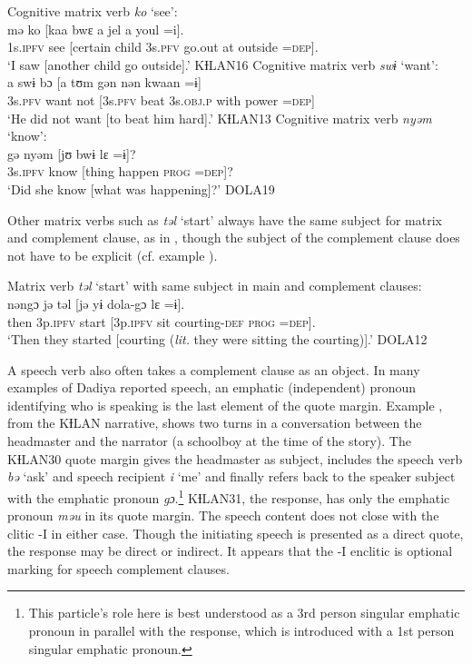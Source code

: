 \documentclass[output=paper]{langscibook}
\begin{document}
\ea Cognitive matrix verb \textit{ko} `see':
\label{ex:dettweiler:KƗLAN16} \\
\gll mə ko [kaa bwɛ a jel a youl =i]. \\
1s.\textsc{ipfv} see [certain child 3s.\textsc{pfv} go.out at outside =\textsc{dep}]. \\
\glt `I saw [another child go outside].' KƗLAN16
\ex Cognitive matrix verb \textit{swɨ} `want':
\label{ex:dettweiler:KƗLAN13} \\
\gll a swɨ bɔ [a tʊm gən nən kwaan =ɨ] \\
3s.\textsc{pfv} want not [3s.\textsc{pfv} beat 3s.\textsc{obj}.\textsc{p} with power =\textsc{dep}] \\
\glt `He did not want [to beat him hard].' KƗLAN13
\ex Cognitive matrix verb \textit{nyəm} `know':
\label{ex:dettweiler:DOLA19} \\
\gll gə nyəm [jʊ bwɨ lɛ =ɨ]? \\
3s.\textsc{ipfv} know [thing happen \textsc{prog} =\textsc{dep}]? \\
\glt `Did she know [what was happening]?' DOLA19
\z

\noindent Other matrix verbs such as \textit{təl} `start' always have the same subject for matrix and complement clause, as in , though the subject of the complement clause does not have to be explicit (cf. example ).

\ea Matrix verb \textit{təl} `start' with same subject in main and complement clauses:\label{ex:dettweiler:DOLA12}\\
\gll nəngɔ jə təl [jə yɨ dola-gɔ lɛ =ɨ]. \\
then 3p.\textsc{ipfv} start [3p.\textsc{ipfv} sit courting-\textsc{def} \textsc{prog} =\textsc{dep}]. \\
\glt `Then they started [courting (\textit{lit.} they were sitting the courting)].' DOLA12
\z

\noindent A speech verb also often takes a complement clause as an object. In many examples of Dadiya reported speech, an emphatic (independent) pronoun identifying who is speaking is the last element of the quote margin. Example , from the KƗLAN narrative, shows two turns in a conversation between the headmaster and the narrator (a schoolboy at the time of the story). The KƗLAN30 quote margin gives the headmaster as subject, includes the speech verb \textit{bə} `ask' and speech recipient \textit{i} `me' and finally refers back to the speaker subject with the emphatic pronoun \textit{gɔ}.\footnote{This particle's role here is best understood as a 3rd person singular emphatic pronoun in parallel with the response, which is introduced with a 1st person singular emphatic pronoun.} KƗLAN31, the response, has only the emphatic pronoun \textit{məu} in its quote margin. The speech content does not close with the clitic -I in either case. Though the initiating speech is presented as a direct quote, the response may be direct or indirect. It appears that the -I enclitic is optional marking for speech complement clauses.
\end{document}
